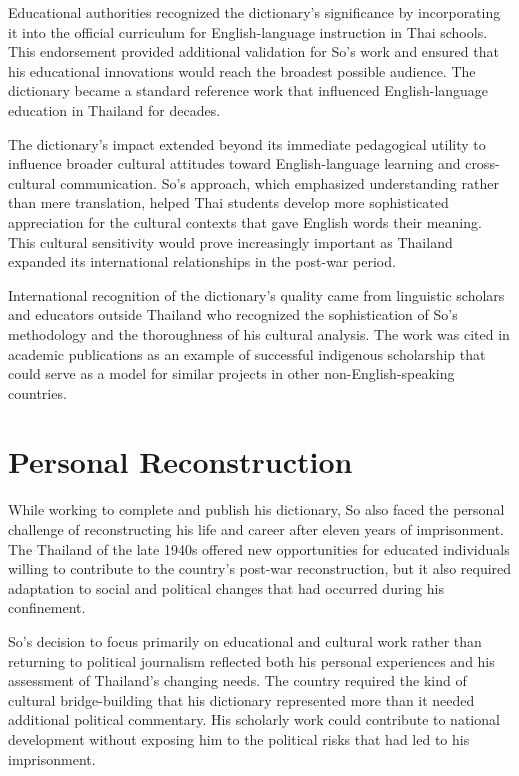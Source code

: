 \documentclass[
  Letterpaper,
]{scrbook}
\begin{document}
Educational authorities recognized the dictionary's significance by
incorporating it into the official curriculum for English-language
instruction in Thai schools. This endorsement provided additional
validation for So's work and ensured that his educational innovations
would reach the broadest possible audience. The dictionary became a
standard reference work that influenced English-language education in
Thailand for decades.

The dictionary's impact extended beyond its immediate pedagogical
utility to influence broader cultural attitudes toward English-language
learning and cross-cultural communication. So's approach, which
emphasized understanding rather than mere translation, helped Thai
students develop more sophisticated appreciation for the cultural
contexts that gave English words their meaning. This cultural
sensitivity would prove increasingly important as Thailand expanded its
international relationships in the post-war period.

International recognition of the dictionary's quality came from
linguistic scholars and educators outside Thailand who recognized the
sophistication of So's methodology and the thoroughness of his cultural
analysis. The work was cited in academic publications as an example of
successful indigenous scholarship that could serve as a model for
similar projects in other non-English-speaking countries.

\section{Personal Reconstruction}\label{personal-reconstruction}

While working to complete and publish his dictionary, So also faced the
personal challenge of reconstructing his life and career after eleven
years of imprisonment. The Thailand of the late 1940s offered new
opportunities for educated individuals willing to contribute to the
country's post-war reconstruction, but it also required adaptation to
social and political changes that had occurred during his confinement.

So's decision to focus primarily on educational and cultural work rather
than returning to political journalism reflected both his personal
experiences and his assessment of Thailand's changing needs. The country
required the kind of cultural bridge-building that his dictionary
represented more than it needed additional political commentary. His
scholarly work could contribute to national development without exposing
him to the political risks that had led to his imprisonment.
\end{document}

